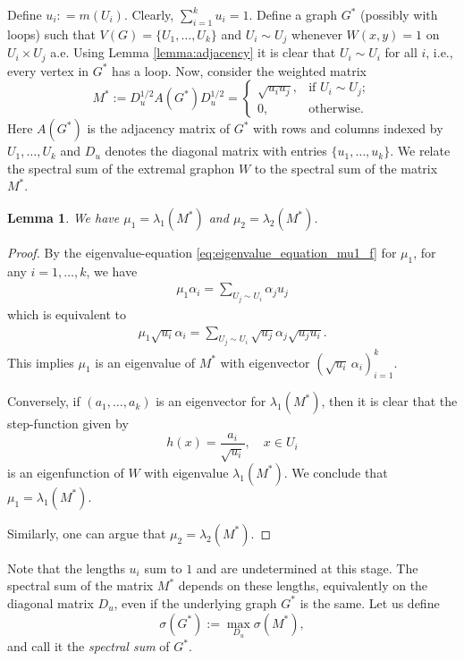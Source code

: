 \documentclass[11pt]{article}
\theoremstyle{plain}
\newtheorem{lemma}[theorem]{Lemma}
\theoremstyle{definition}
\numberwithin{equation}{section}
\begin{document}
Define $u_i: = m(U_i)$. Clearly, $\sum_{i=1}^k u_i = 1$. Define a graph $G^*$ (possibly with loops) 
such that $V(G) = \{U_1, \ldots, U_k\}$ and $U_i\sim U_j$ whenever $W(x,y) = 1$ on $U_i\times U_j$ 
a.e. Using Lemma \ref{lemma:adjacency} it is clear that $U_i\sim U_i$ for all $i$, i.e., every 
vertex in $G^*$ has a loop. Now, consider the weighted matrix 
\[
M^* := D_{u}^{1/2} A(G^*)D_{u}^{1/2} = 
\begin{cases}
    \sqrt{u_iu_j}, & \text{if }U_i\sim U_j; \\
    0, & \text{otherwise}.
\end{cases}
\]
Here $A(G^*)$ is the adjacency matrix of $G^*$ with rows and columns indexed by 
$U_1, \ldots, U_k$ and $D_{u}$ denotes the diagonal matrix with entries $\{u_1, \ldots, u_k\}$. 
We relate the spectral sum of the extremal graphon $W$ to the spectral sum of the matrix $M^*$.

\begin{lemma}\label{lemma:weighted_graph}
We have $\mu_1 = \lambda_1(M^*)$ and $\mu_2 = \lambda_2(M^*)$.
\end{lemma}

\begin{proof}
By the eigenvalue-equation \eqref{eq:eigenvalue_equation_mu1_f} for $\mu_1$, 
for any $i = 1, \ldots, k$, we have 
\begin{align*}
\mu_1\alpha_i = \sum_{U_j\sim U_i} \alpha_j u_j 
\end{align*}
which is equivalent to 
\begin{align*}
\mu_1 \sqrt{u_i}\alpha_i = \sum_{U_j\sim U_i} \sqrt{u_j} \alpha_j \sqrt{u_ju_i}.
\end{align*}
This implies $\mu_1$ is an eigenvalue of $M^*$ with eigenvector $(\sqrt{u_i}\,\alpha_i)_{i=1}^k$. 

Conversely, if $(a_1, \ldots, a_k)$ is an eigenvector for $\lambda_1(M^*)$, 
then it is clear that the step-function given by 
\[
h(x) = \frac{a_i}{\sqrt{u_i}}, \quad x\in U_i
\]
is an eigenfunction of $W$ with eigenvalue $\lambda_1(M^*)$. We conclude that $\mu_1 = \lambda_1(M^*)$. 

Similarly, one can argue that $\mu_2 = \lambda_2(M^*)$.
\end{proof}

Note that the lengths $u_i$ sum to $1$ and are undetermined at this stage. 
The spectral sum of the matrix $M^*$ depends on these lengths, equivalently on 
the diagonal matrix $D_u$, even if the underlying graph $G^*$ is the same. Let us define 
\[
\sigma(G^*) := \max_{D_u} \sigma(M^*),
\]
and call it the \emph{spectral sum} of $G^*$. 
\end{document}
